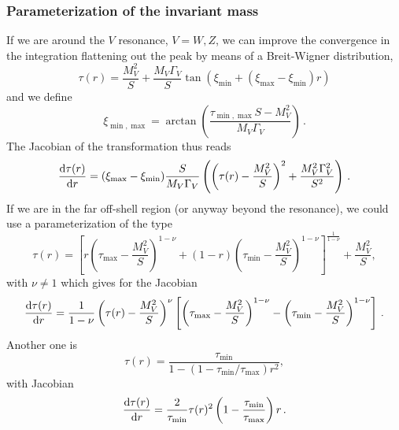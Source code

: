 \documentclass[a4paper,11pt]{article}
\begin{document}
\subsubsection{Parameterization of the invariant mass}
If we are around the $V$ resonance, $V=W,Z$,
we can improve the convergence in the integration flattening out the peak 
by means of a Breit-Wigner distribution, \ie
\begin{equation}
\tau(r) = 
\frac{M^2_V}{S} + \frac{M_V \Gamma_V}{S} \tan\left(\xi_{\min} + (\xi_{\max}-\xi_{\min})r\right) 
\end{equation}
and we define
\begin{equation}
\xi_{\min,\max} = \arctan\left(\frac{\tau_{\min,\max}S -M^2_V}{M_V \Gamma_V}\right)\,.
\end{equation}
The Jacobian of the transformation thus reads
\begin{equation}
\frac{\mathrm d \tau(r)}{\mathrm d r} = 
(\xi_{\max}-\xi_{\min})\frac{S}{M_V \Gamma_V}
\left(\left(\tau(r)-\frac{M^2_V}{S}\right)^2 + \frac{M^2_V \Gamma^2_V}{S^2}\right)\, .
\end{equation}
If we are in the far off-shell region (or anyway beyond the resonance),
we could use a parameterization of the type
\begin{equation}
\tau(r) = \left[
r\left(\tau_{\max}-\frac{M^2_V}{S}\right)^{1-\nu} + 
(1-r)\left(\tau_{\min}-\frac{M^2_V}{S}\right)^{1-\nu}
\right]^{\frac{1}{1-\nu}} + \frac{M^2_V}{S},
\end{equation}
with $\nu\neq 1$ which gives for the Jacobian
\begin{equation}
\frac{\mathrm d \tau(r)}{\mathrm d r} =
\frac{1}{1-\nu}
\left(\tau(r) - \frac{M^2_V}{S}\right)^\nu
\left[\left(\tau_{\max}-\frac{M^2_V}{S}\right)^{1-\nu}-
\left(\tau_{\min}-\frac{M^2_V}{S}\right)^{1-\nu}\right]\,.
\end{equation}
Another one is
\begin{equation}
\tau(r) = \frac{\tau_{\min}}{1-(1-\tau_{\min}/\tau_{\max})r^2},
\end{equation}
with Jacobian
\begin{equation}
\frac{\mathrm d \tau(r)}{\mathrm d r} = \frac{2}{\tau_{\min}}\tau(r)^2
\left(1-\frac{\tau_{\min}}{\tau_{\max}}\right)r\,.
\end{equation}
%
%
%
\end{document}
